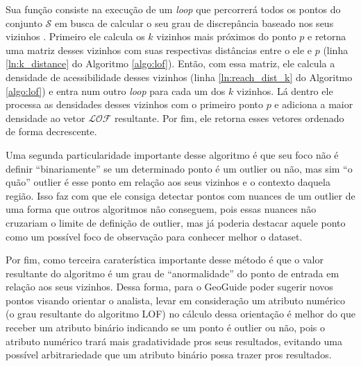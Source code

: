 Sua função consiste na execução de um \textit{loop} que percorrerá todos os pontos do conjunto $\mathcal{S}$ em busca de calcular o seu grau de discrepância baseado nos seus vizinhos \cite{DBLP:conf:AlshawabkehJK10}. Primeiro ele calcula os $k$ vizinhos mais próximos do ponto $p$ e retorna uma matriz desses vizinhos com suas respectivas distâncias entre o ele e $p$ (linha \ref{ln:k_distance} do Algoritmo \ref{algo:lof}). Então, com essa matriz, ele calcula a densidade de acessibilidade desses vizinhos (linha \ref{ln:reach_dist_k} do Algoritmo \ref{algo:lof}) e entra num outro \textit{loop} para cada um dos $k$ vizinhos. Lá dentro ele processa as densidades desses vizinhos com o primeiro ponto $p$ e adiciona a maior densidade ao vetor $\mathcal{LOF}$ resultante. Por fim, ele retorna esses vetores ordenado de forma decrescente. 

Uma segunda particularidade importante desse algoritmo é que seu foco não é definir ``binariamente'' se um determinado ponto é um outlier ou não, mas sim ``o quão'' outlier é esse ponto em relação aos seus vizinhos e o contexto daquela região. Isso faz com que ele consiga detectar pontos com nuances de um outlier de uma forma que outros algoritmos não conseguem, pois essas nuances não cruzariam o limite de definição de outlier, mas já poderia destacar aquele ponto como um possível foco de observação para conhecer melhor o dataset.

Por fim, como terceira caraterística importante desse método é que o valor resultante do algoritmo é um grau de ``anormalidade'' do ponto de entrada em relação aos seus vizinhos. Dessa forma, para o GeoGuide poder sugerir novos pontos visando orientar o analista, levar em consideração um atributo numérico (o grau resultante do algoritmo LOF) no cálculo dessa orientação é melhor do que receber um atributo binário indicando se um ponto é outlier ou não, pois o atributo numérico trará mais gradatividade pros seus resultados, evitando uma possível arbitrariedade que um atributo binário possa trazer pros resultados.